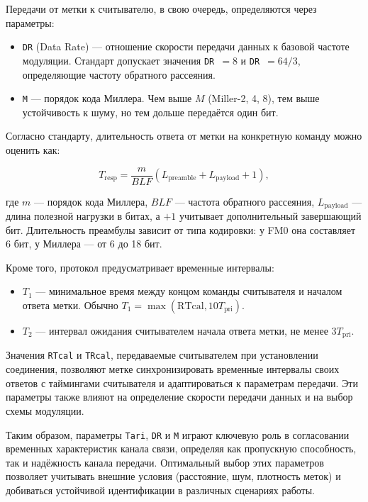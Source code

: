 \documentclass[12pt]{article}
\theoremstyle{definition}
\begin{document}
Передачи от метки к считывателю, в свою очередь, определяются через параметры:

\begin{itemize}
    \item \texttt{DR} (Data Rate) — отношение скорости передачи данных к базовой частоте модуляции. Стандарт допускает значения \texttt{DR}~$=8$ и \texttt{DR}~$=64/3$, определяющие частоту обратного рассеяния.
    \item \texttt{M} — порядок кода Миллера. Чем выше $M$ (Miller-2, 4, 8), тем выше устойчивость к шуму, но тем дольше передаётся один бит.
\end{itemize}

Согласно стандарту, длительность ответа от метки на конкретную команду можно оценить как:

\[
T_{\text{resp}} = \frac{m}{BLF}(L_{\text{preamble}} + L_{\text{payload}} + 1),
\]

где $m$ — порядок кода Миллера, $BLF$ — частота обратного рассеяния, $L_{\text{payload}}$ — длина полезной нагрузки в битах, а $+1$ учитывает дополнительный завершающий бит. Длительность преамбулы зависит от типа кодировки: у FM0 она составляет 6 бит, у Миллера — от 6 до 18 бит.

Кроме того, протокол предусматривает временные интервалы:

\begin{itemize}
    \item $T_1$ — минимальное время между концом команды считывателя и началом ответа метки. Обычно $T_1 = \max(\text{RTcal}, 10T_{\text{pri}})$.
    \item $T_2$ — интервал ожидания считывателем начала ответа метки, не менее $3T_{\text{pri}}$.
\end{itemize}

Значения \texttt{RTcal} и \texttt{TRcal}, передаваемые считывателем при установлении соединения, позволяют метке синхронизировать временные интервалы своих ответов с таймингами считывателя и адаптироваться к параметрам передачи. Эти параметры также влияют на определение скорости передачи данных и на выбор схемы модуляции.

Таким образом, параметры \texttt{Tari}, \texttt{DR} и \texttt{M} играют ключевую роль в согласовании временных характеристик канала связи, определяя как пропускную способность, так и надёжность канала передачи. Оптимальный выбор этих параметров позволяет учитывать внешние условия (расстояние, шум, плотность меток) и добиваться устойчивой идентификации в различных сценариях работы.
\end{document}
